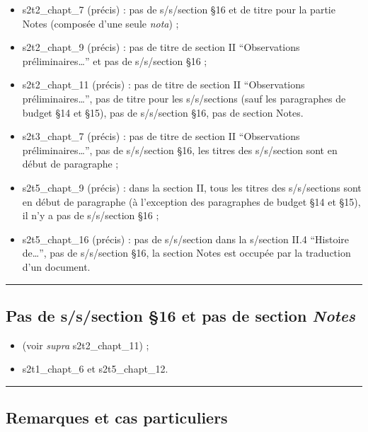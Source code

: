 \begin{itemize}
\item
  s2t2\_chapt\_7 (précis) : pas de s/s/section §16 et de titre pour la
  partie Notes (composée d'une seule \emph{nota}) ;
\item
  s2t2\_chapt\_9 (précis) : pas de titre de section II ``Observations
  préliminaires\ldots{}'' et pas de s/s/section §16 ;
\item
  s2t2\_chapt\_11 (précis) : pas de titre de section II ``Observations
  préliminaires\ldots{}'', pas de titre pour les s/s/sections (sauf les
  paragraphes de budget §14 et §15), pas de s/s/section §16, pas de
  section Notes.
\item
  s2t3\_chapt\_7 (précis) : pas de titre de section II ``Observations
  préliminaires\ldots{}'', pas de s/s/section §16, les titres des
  s/s/section sont en début de paragraphe ;
\item
  s2t5\_chapt\_9 (précis) : dans la section II, tous les titres des
  s/s/sections sont en début de paragraphe (à l'exception des
  paragraphes de budget §14 et §15), il n'y a pas de s/s/section §16 ;
\item
  s2t5\_chapt\_16 (précis) : pas de s/s/section dans la s/section II.4
  ``Histoire de\ldots{}'', pas de s/s/section §16, la section Notes est
  occupée par la traduction d'un document.
\end{itemize}

\begin{center}\rule{3in}{0.4pt}\end{center}

\subsection{Pas de s/s/section §16 et pas de section
\textit{Notes}}\label{ann:no-notes-no-16}

\begin{itemize}
\item
  (voir \emph{supra} s2t2\_chapt\_11) ;
\item
  s2t1\_chapt\_6 et s2t5\_chapt\_12.
\end{itemize}

\begin{center}\rule{3in}{0.4pt}\end{center}

\subsection{Remarques et cas
particuliers}\label{ann:remarques-et-cas-particuliers}

